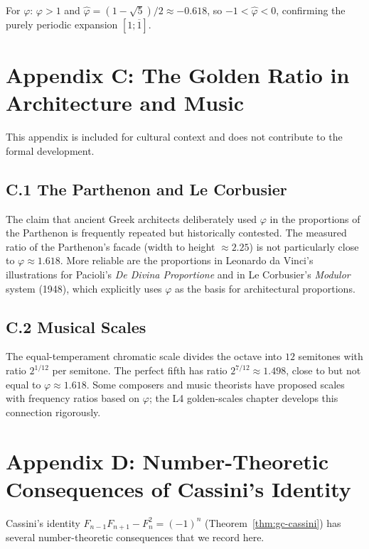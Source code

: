 For $\varphi$: $\varphi > 1$ and
$\hat\varphi = (1-\sqrt{5})/2 \approx -0.618$,
so $-1 < \hat\varphi < 0$, confirming the purely
periodic expansion $[1;\overline{1}]$.

\section{Appendix C: The Golden Ratio in Architecture and Music}
\label{sec:gc-appendix-art}

This appendix is included for cultural context and
does not contribute to the formal development.

\subsection{C.1 The Parthenon and Le Corbusier}
\label{subsec:gc-parthenon}

The claim that ancient Greek architects deliberately
used $\varphi$ in the proportions of the Parthenon
is frequently repeated but historically contested.
The measured ratio of the Parthenon's facade
(width to height $\approx 2.25$) is not particularly
close to $\varphi \approx 1.618$.
More reliable are the proportions in Leonardo da Vinci's
illustrations for Pacioli's \emph{De Divina Proportione}
and in Le Corbusier's \emph{Modulor} system
(1948), which explicitly uses $\varphi$ as the basis
for architectural proportions.

\subsection{C.2 Musical Scales}
\label{subsec:gc-music}

The equal-temperament chromatic scale divides the
octave into $12$ semitones with ratio $2^{1/12}$
per semitone.
The perfect fifth has ratio $2^{7/12} \approx 1.498$,
close to but not equal to $\varphi \approx 1.618$.
Some composers and music theorists have proposed
scales with frequency ratios based on $\varphi$;
the L4 golden-scales chapter develops this
connection rigorously.

\section{Appendix D: Number-Theoretic Consequences of Cassini's Identity}
\label{sec:gc-appendix-cassini}

Cassini's identity $F_{n-1}F_{n+1} - F_n^2 = (-1)^n$
(Theorem~\ref{thm:gc-cassini}) has several
number-theoretic consequences that we record here.

